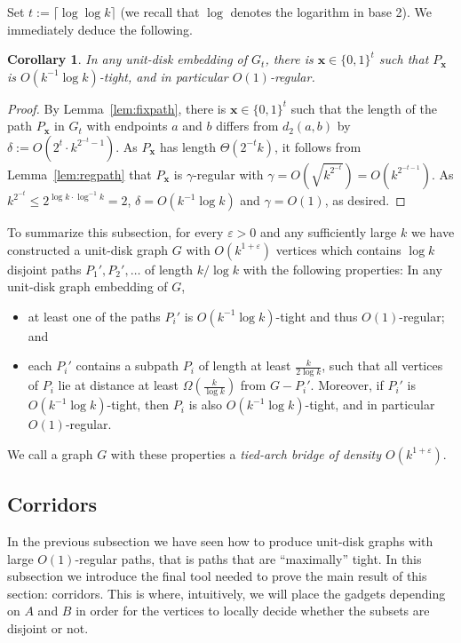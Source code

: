 \documentclass[a4paper,reqno, 12pt]{amsart}
\newtheorem{corollary}[theorem]{Corollary}
\begin{document}
Set $t:=\lceil\log \log
k\rceil $ (we recall that $\log$ denotes the logarithm in base 2). 
We immediately deduce the following. 

\begin{corollary}\label{cor:regpath}
   In any unit-disk embedding of $G_t$, there is $\mathbf{x}\in
\{0,1\}^t$ such that $P_\mathbf{x}$ is $O(k^{-1}\log k)$-tight, and in particular $O(1)$-regular.
\end{corollary}

\begin{proof}
 By Lemma~\ref{lem:fixpath}, there is $\mathbf{x}\in
\{0,1\}^t$ such that the length of the path $P_\mathbf{x}$ in $G_t$ with endpoints $a$ and
$b$ differs from $d_2(a,b)$ by $\delta:=O(2^t\cdot
k^{2^{-t}-1})$. As
$P_\mathbf{x}$ has length $\Theta(2^{-t}k)$, it follows from Lemma~\ref {lem:regpath} that $P_\mathbf{x}$ is $\gamma$-regular with
$\gamma=O\left(\sqrt{k^{2^{-t}}}\right)=O\left(k^{2^{-t-1}}\right)$. As
$k^{2^{-t}}\le 2^{\log k\cdot \log^{-1}k}= 2$, $\delta=O(k^{-1}\log
k)$ and $\gamma=O(1)$,
as desired.
\end{proof}

To summarize this subsection, for every $\varepsilon>0$ and any sufficiently large $k $ we
have constructed a unit-disk graph $G$ with $O(k^{1+\varepsilon})$
vertices which contains $\log k$ disjoint paths $P_1',P_2', \ldots$
of length $k/\log k$
with the following properties: In any unit-disk graph embedding of
$G$,
\begin{itemize}
\item at least one of the paths $P_i'$ is $O(k^{-1}\log k)$-tight and
  thus $O(1)$-regular; and
  \item each $P_i'$ contains a subpath $P_i$ of
    length at least $\tfrac{k}{2\log k}$, such that all vertices of $P_i$ lie
    at distance at least $\Omega(\tfrac{k}{\log k})$ from $G-P_i'$. Moreover,
    if $P_i'$ is $O(k^{-1}\log k)$-tight, then  $P_i$ is also
    $O(k^{-1}\log k)$-tight, and in particular $O(1)$-regular.
  \end{itemize}

  We call a graph $G$ with these properties a \emph{tied-arch bridge
    of density $O(k^{1+\varepsilon})$}.

\subsection{Corridors}\label{sec:cor}

In the previous subsection we have seen how to produce unit-disk graphs
with large $O(1)$-regular paths, that is paths  that are ``maximally''
 tight. In this  subsection we introduce the final tool needed to
prove the main result of this section: corridors. This is 
where, intuitively, we will place the gadgets depending on $A$ and $B$
in order for the vertices to locally decide whether the subsets are disjoint or not.
\end{document}

